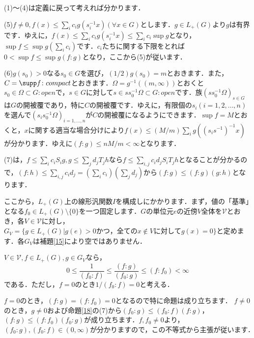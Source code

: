 \begin{Proof}
(1)〜(4)は定義に戻って考えれば分かります．

(5)$f \ne 0, f(x) \le \sum_{i}c_{i} g(s_{i}^{-1}x) (\forall x \in G)$とします．$g \in L_{+}(G)$より$g$は有界です．ゆえに，$f(x) \le \sum_{i}c_{i} g(s_{i}^{-1}x) \le \sum_{i}c_{i} \sup g$となり，$\sup f \le \sup g ( \sum_{i}c_{i} )$です．$c_i$たちに関する下限をとれば$0<\sup f \le \sup g (f \colon g )$となり，ここから(5)が従います．

(6)$g(s_{0}) > 0$なる$s_{0} \in G$を選び，$(1/2)g(s_{0})=m$とおきます．また，$C=\supp f \colon compact$とおきます．$\Omega = g^{-1}( (m, \infty) )$とおくと$s_{0} \in \Omega \subset G \colon open$で，$s \in G$に対して$s \in s s_{0}^{-1} \Omega \subset G \colon open$です．族$( s s_{0}^{-1}\Omega )_{s \in G}$は$G$の開被覆であり，特に$C$の開被覆です．ゆえに，有限個の$ s_i(i=1,2, \ldots , n)$を選んで$( s_{i} s_{0}^{-1}\Omega )_{i=1,\ldots ,n}$が$C$の開被覆になるようにできます．$\sup f=M$とおくと，$x$に関する適当な場合分けにより$f(x) \le (M/m)\sum_{i} g( (s_{i} s^{-1}) ^{-1}x)$が分かります．ゆえに$(f \colon g ) \le nM/m < \infty $となります．

(7)は，$f \le \sum_{i} c_{i}S_{i}g, g \le \sum_{j} d_{j}T_{j}h$なら$f \le \sum_{i,j} c_{i}d_{j}S_iT_{j}h$となることが分かるので，$(f \colon h ) \le \sum_{i,j} c_{i}d_{j} = ( \sum_{i} c_{i} ) (\sum_{j} d_{j} )$から$( f \colon g ) \le (f \colon g ) (g \colon h )$となります．　
\end{Proof}

ここから，$L_{+}(G)$上の線形汎関数$I$を構成しにかかります．まず，値の「基準」となる$f_{0} \in L_{+}(G) \setminus \{ 0 \}$を一つ固定します．$G$の単位元$e$の近傍$V$全体を$\mathscr{V}$とおき，各$V \in \mathscr{V}$に対し，$G_{V}=\{ g \in L_{+}(G) | g(e)>0 かつ，全ての x \not\in V に対してg(x)=0 \}$と定めます．各$G_V$は補題\ref{15}により空ではありません．

\begin{prop}\label{19}
$V \in \mathscr{V}, f \in L_{+}(G), g \in G_{V}$なら，
\[
0 \le \frac{1}{( f_0 \colon f )} \le \frac{( f \colon g )}{( f_0 \colon g )} \le ( f \colon f_0 ) < \infty
\]
である．ただし，$f=0$のとき$1/( f_0 \colon f ) = 0$と考える．
\end{prop}
\begin{Proof}
$f=0$のとき，$( f \colon g ) = ( f \colon f_0 ) = 0$となるので特に命題は成り立ちます．
$f \ne 0$のとき，$g \neq 0$および命題\ref{18}の(7)から$(f_0 \colon g) \le (f_0 \colon f) (f \colon g )$，$ (f \colon g) \le (f \colon f_0 ) (f_0 \colon g )$が成り立ちます．$f, f_0 \neq 0$より，$(f_0 \colon g), (f_0 \colon f) \in (0, \infty)$が分かりますので，この不等式から主張が従います．　
\end{Proof}

